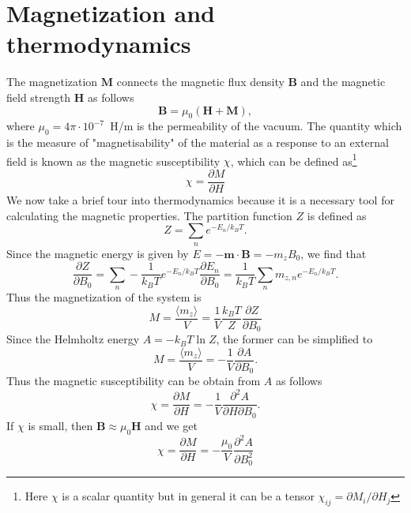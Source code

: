 \section{Magnetization and thermodynamics}
The magnetization $\mathbf{M}$ connects the magnetic flux density $\mathbf{B}$ and the magnetic field strength $\mathbf{H}$ as follows
\begin{equation}
\mathbf{B}= \mu_0(\mathbf{H}+\mathbf{M}),
\end{equation}
where $\mu_0 = 4\pi \cdot 10^{-7}$~H/m is the permeability of the vacuum. The quantity which is the measure of "magnetisability" of the material as a response to an external field is known as the magnetic susceptibility $\chi$, which can be defined as\footnote{Here $\chi$ is a scalar quantity but in general it can be a tensor $\chi_{ij} = \partial M_i/\partial H_j$}
\begin{equation}
\chi = \frac{\partial M}{\partial H}
\end{equation}
We now take a brief tour into thermodynamics because it is a necessary tool for calculating the magnetic properties. The partition function $Z$ is defined as
\begin{equation}
Z =  \sum_{n} e^{-E_n/k_B T}.
\end{equation} 
Since the magnetic energy is given by $E=-\mathbf{m}\cdot\mathbf{B}=-m_zB_0$, we find that
\begin{equation}
\frac{\partial Z}{\partial B_0} = \sum_{n} -\frac{1}{k_B T} e^{-E_n/k_B T} \frac{\partial E_n}{\partial B_0} =  \frac{1}{k_B T} \sum_{n} m_{z,n} e^{-E_n/k_B T}.
\end{equation}
Thus the magnetization of the system is
\begin{equation}
M = \frac{\langle m_z\rangle}{V} = \frac{1}{V}\frac{k_B T}{Z} \frac{\partial Z}{\partial B_0}
\end{equation}
Since the Helmholtz energy $A = - k_B T \ln Z$, the former can be simplified
to
\begin{equation}
M = \frac{\langle m_z\rangle}{V} = - \frac{1}{V} \frac{\partial A}{\partial B_0}.
\end{equation}
Thus the magnetic susceptibility can be obtain from $A$ as follows
\begin{equation}
\chi = \frac{\partial M}{\partial H} =  - \frac{1}{V} \frac{\partial^2 A}{\partial H \partial B_0}.
\end{equation}
If $\chi$ is small, then $\mathbf{B} \approx \mu_0 \mathbf{H}$ and we get
\begin{equation}
\chi = \frac{\partial M}{\partial H} =  - \frac{\mu_0}{V} \frac{\partial^2 A}{\partial B_0^2}
\end{equation}

